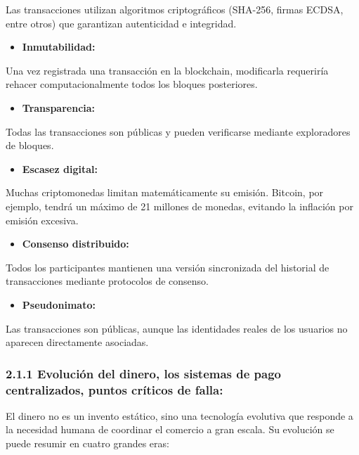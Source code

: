 \documentclass[12pt,a4paper]{article}
\begin{document}
Las transacciones utilizan algoritmos criptográficos (SHA-256, firmas ECDSA, entre otros)
que garantizan autenticidad e integridad.

\begin{itemize}
  \item \textbf{Inmutabilidad:}
\end{itemize}

Una vez registrada una transacción en la blockchain, modificarla requeriría rehacer
computacionalmente todos los bloques posteriores.

\begin{itemize}
  \item \textbf{Transparencia:}
\end{itemize}

Todas las transacciones son públicas y pueden verificarse mediante exploradores de
bloques.

\begin{itemize}
  \item \textbf{Escasez digital:}
\end{itemize}

Muchas criptomonedas limitan matemáticamente su emisión. Bitcoin, por ejemplo, tendrá un
máximo de 21 millones de monedas, evitando la inflación por emisión excesiva.

\begin{itemize}
  \item \textbf{Consenso distribuido:}
\end{itemize}

Todos los participantes mantienen una versión sincronizada del historial de transacciones
mediante protocolos de consenso.

\begin{itemize}
  \item \textbf{Pseudonimato:}
\end{itemize}

Las transacciones son públicas, aunque las identidades reales de los usuarios no aparecen
directamente asociadas.

\subsubsection*{2.1.1 Evolución del dinero, los sistemas de pago centralizados, puntos críticos de falla:}

El dinero no es un invento estático, sino una tecnología evolutiva que responde a la
necesidad humana de coordinar el comercio a gran escala. Su evolución se puede resumir
en cuatro grandes eras:
\end{document}
